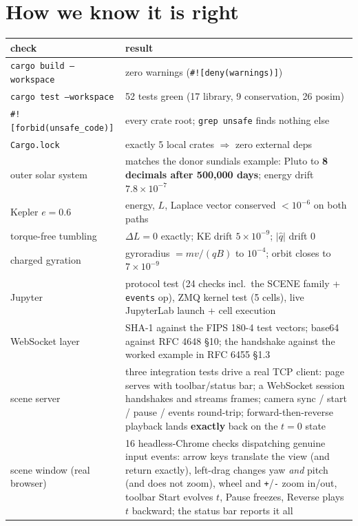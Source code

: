 \documentclass[11pt]{article}
\newcommand{\code}[1]{\texttt{#1}}
\begin{document}
\section{How we know it is right}\label{sec:verify}

\begin{center}
\begin{tabular}{p{6.2cm}p{8.2cm}}
\textbf{check} & \textbf{result}\\\hline
\code{cargo build --workspace} & zero warnings (\code{\#![deny(warnings)]})\\
\code{cargo test --workspace} & 52 tests green (17 library, 9 conservation, 26 posim)\\
\code{\#![forbid(unsafe\_code)]} & every crate root; \code{grep unsafe} finds nothing else\\
\code{Cargo.lock} & exactly 5 local crates $\Rightarrow$ zero external deps\\
outer solar system & matches the donor sundials example: Pluto to \textbf{8 decimals after 500{,}000 days}; energy drift $7.8\times10^{-7}$\\
Kepler $e=0.6$ & energy, $L$, Laplace vector conserved $<10^{-6}$ on both paths\\
torque-free tumbling & $\Delta L = 0$ exactly; KE drift $5\times10^{-9}$; $|\hat q|$ drift 0\\
charged gyration & gyroradius $= mv/(qB)$ to $10^{-4}$; orbit closes to $7\times10^{-9}$\\
Jupyter & protocol test (24 checks incl.\ the SCENE family + \code{events} op), ZMQ kernel test (5 cells), live JupyterLab launch + cell execution\\
WebSocket layer & SHA-1 against the FIPS 180-4 test vectors; base64 against RFC 4648 \S10; the handshake against the worked example in RFC 6455 \S1.3\\
scene server & three integration tests drive a real TCP client: page serves with toolbar/status bar; a WebSocket session handshakes and streams frames; camera sync / start / pause / events round-trip; forward-then-reverse playback lands \textbf{exactly} back on the $t=0$ state\\
scene window (real browser) & 16 headless-Chrome checks dispatching genuine input events: arrow keys translate the view (and return exactly), left-drag changes yaw \emph{and} pitch (and does not zoom), wheel and \code{+}/\code{-} zoom in/out, toolbar Start evolves $t$, Pause freezes, Reverse plays $t$ backward; the status bar reports it all\\
\end{tabular}
\end{center}
\end{document}
